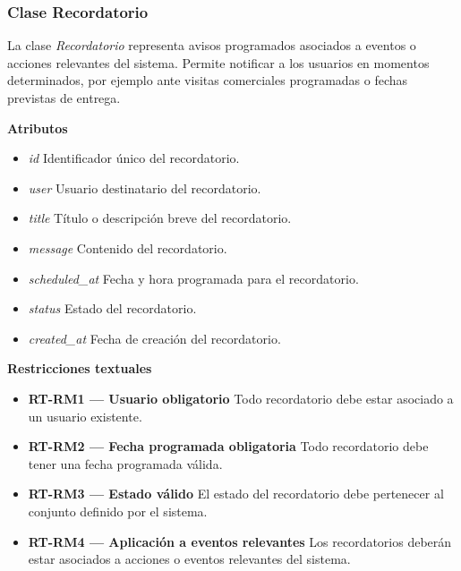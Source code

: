 \subsubsection{Clase Recordatorio}

La clase \textit{Recordatorio} representa avisos programados asociados a eventos o acciones relevantes del sistema. Permite notificar a los usuarios en momentos determinados, por ejemplo ante visitas comerciales programadas o fechas previstas de entrega.

\textbf{Atributos}

\begin{itemize}

      \item \textit{id}
            Identificador único del recordatorio.
      \item \textit{user}
            Usuario destinatario del recordatorio.
      \item \textit{title}
            Título o descripción breve del recordatorio.
      \item \textit{message}
            Contenido del recordatorio.
      \item \textit{scheduled\_at}
            Fecha y hora programada para el recordatorio.
      \item \textit{status}
            Estado del recordatorio.
      \item \textit{created\_at}
            Fecha de creación del recordatorio.

\end{itemize}

\textbf{Restricciones textuales}

\begin{itemize}

      \item \textbf{RT-RM1 — Usuario obligatorio}
            Todo recordatorio debe estar asociado a un usuario existente.
      \item \textbf{RT-RM2 — Fecha programada obligatoria}
            Todo recordatorio debe tener una fecha programada válida.
      \item \textbf{RT-RM3 — Estado válido}
            El estado del recordatorio debe pertenecer al conjunto definido por el sistema.
      \item \textbf{RT-RM4 — Aplicación a eventos relevantes}
            Los recordatorios deberán estar asociados a acciones o eventos relevantes del sistema.

\end{itemize}

